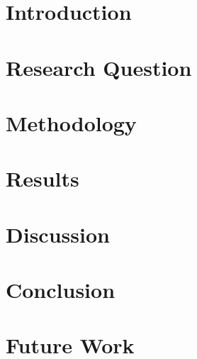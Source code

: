 \documentclass{article}
\begin{document}
 

\pagestyle{empty} %

\titleGP %

\vspace*{10\baselineskip} %
\tableofcontents
\vspace*{25\baselineskip}
\section{Introduction}

\section{Research Question}

\section{Methodology}

\section{Results}

\section{Discussion}

\section{Conclusion}

\section{Future Work}


\vspace*{2\baselineskip} %

\begin{thebibliography}{9}
\end{thebibliography}
\end{document}
